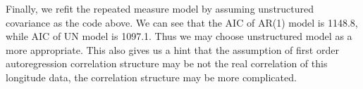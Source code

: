 \documentclass[letterpaper, 12pt]{article}
\begin{document}
Finally, we refit the repeated measure model by assuming unstructured covariance as the code above. We can see that the AIC of AR(1) model is 1148.8, while AIC of UN model is 1097.1. Thus we may choose unstructured model as a more appropriate. This also gives us a hint that the assumption of first order autoregression correlation structure may be not the real correlation of this longitude data, the correlation structure may be more complicated.








\end{document}
